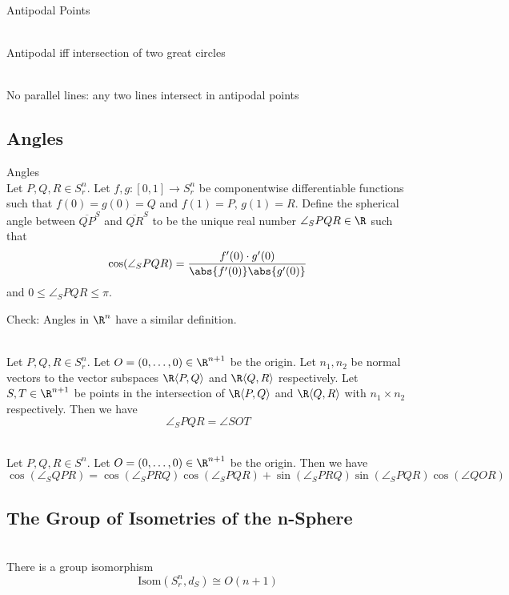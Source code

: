 \documentclass[a4paper]{article}
\begin{document}
\begin{defn}{Antipodal Points}{}
\end{defn}

\begin{prp}{}{}\\
Antipodal iff intersection of two great circles
\end{prp}

\begin{prp}{}{}\\
No parallel lines: any two lines intersect in antipodal points
\end{prp}

\subsection{Angles}
\begin{defn}{Angles}{}\\
Let $P,Q,R\in S_r^n$. Let $f,g:[0,1]\to S_r^n$ be componentwise differentiable functions such that $f(0)=g(0)=Q$ and $f(1)=P$, $g(1)=R$. Define the spherical angle between $\overline{QP}^S$ and $\overline{QR}^S$ to be the unique real number $\angle_SPQR\in\R$ such that $$\cos(\angle_SPQR)=\frac{f'(0)\cdot g'(0)}{\abs{f'(0)}\abs{g'(0)}}$$ and $0\leq\angle_SPQR\leq\pi$. 
\end{defn}

Check: Angles in $\R^n$ have a similar definition. 

\begin{prp}{}{}\\
Let $P,Q,R\in S_r^n$. Let $O=(0,\dots,0)\in\R^{n+1}$ be the origin. Let $n_1,n_2$ be normal vectors to the vector subspaces $\R\langle P,Q\rangle$ and $\R\langle Q,R\rangle$ respectively. Let $S,T\in\R^{n+1}$ be points in the intersection of $\R\langle P,Q\rangle$ and $\R\langle Q,R\rangle$ with $n_1\times n_2$ respectively. Then we have $$\angle_SPQR=\angle SOT$$
\end{prp}

\begin{prp}{}{}\\
Let $P,Q,R\in S^n$. Let $O=(0,\dots,0)\in\R^{n+1}$ be the origin. Then we have $$\cos(\angle_SQPR)=\cos(\angle_SPRQ)\cos(\angle_SPQR)+\sin(\angle_SPRQ)\sin(\angle_SPQR)\cos(\angle QOR)$$
\end{prp}

\subsection{The Group of Isometries of the n-Sphere}
\begin{prp}{}{}\\
There is a group isomorphism $$\text{Isom}(S_r^n,d_S)\cong O(n+1)$$
\end{prp}
\end{document}
